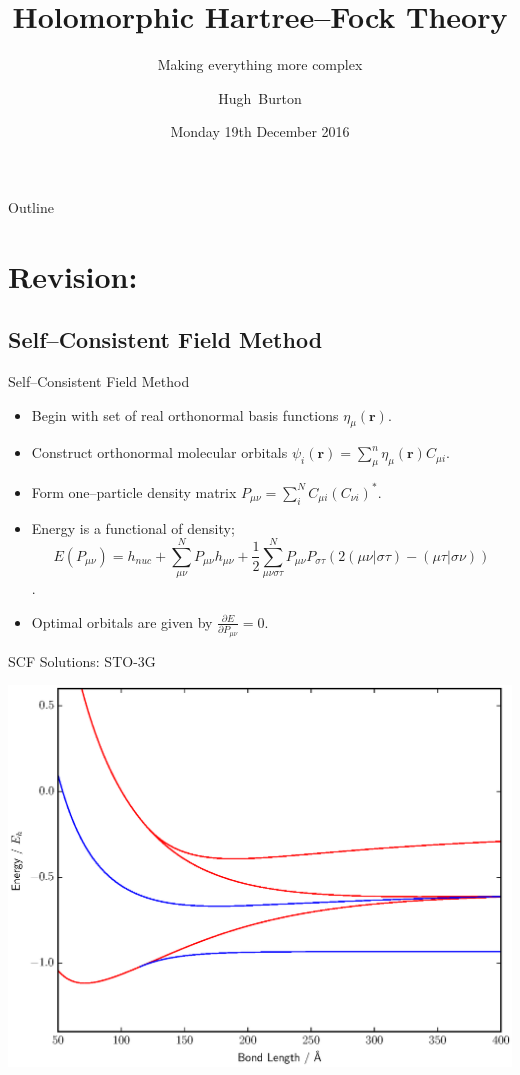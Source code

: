 \documentclass{beamer}
\title[Holomorphic Hartree--Fock Theory]
{%
  Holomorphic Hartree--Fock Theory
}
\subtitle{Making everything more complex}
\author[Burton, Thom]
{
  \hskip-1.7mm
  Hugh~Burton %
}
\institute[Burton and others]
{
  University of Cambridge
}
\date[December 2016]{Monday 19th December 2016}
\newcommand{\dbd}[2] {{\frac{\partial #1}{\partial #2}}}
\begin{document}
\begin{frame}
  \titlepage
\end{frame}

\begin{frame}{Outline}
  \tableofcontents
\end{frame}

\section{Revision:}

\subsection{Self--Consistent Field Method}
\begin{frame}{Self--Consistent Field Method}
 \begin{itemize}
  \item Begin with set of real orthonormal basis functions $\eta_\mu (\mathbf{r})$.
  \item Construct orthonormal molecular orbitals $\psi_i(\mathbf{r}) = \sum_\mu^n \eta_\mu (\mathbf{r}) C_{\mu i}$.
  \item Form one--particle density matrix $P_{\mu\nu}=\sum_i^N C_{\mu i} (C_{\nu i})^{*}$.
  \item Energy is a functional of density;
  $$E(P_{\mu\nu}) = h_{nuc} + \sum_{\mu\nu}^N P_{\mu\nu} h_{\mu\nu} + \frac{1}{2} \sum_{\mu\nu\sigma\tau}^N P_{\mu\nu} P_{\sigma\tau} \left(2\left(\mu\nu|\sigma\tau\right) - \left(\mu\tau|\sigma\nu\right)\right)$$.
  \item Optimal orbitals are given by $\dbd{E}{P_{\mu\nu}}=0$.
 \end{itemize}
\end{frame} 

\begin{frame}{SCF Solutions:  STO-3G}
  \begin{center}
    \includegraphics[scale=0.4]{normal_UHF_HH_sto-3g}
  \end{center}
\end{frame}
\end{document}
